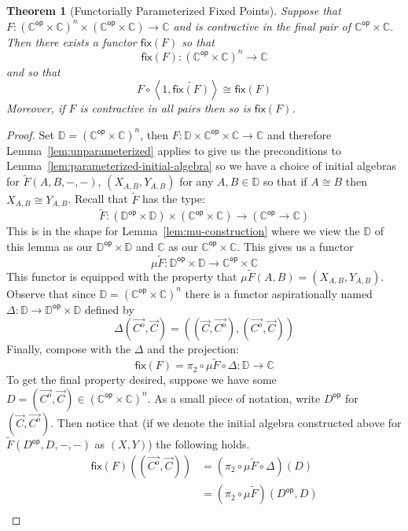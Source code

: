 \documentclass{amsart}
\newtheorem{thm}{Theorem}
\newcommand{\Ccat}{\ensuremath{\mathbb{C}}}
\newcommand{\Dcat}{\ensuremath{\mathbb{D}}}
\newcommand{\op}[1]{\ensuremath{#1^{\mathsf{op}}}}
\newcommand{\symmetrize}[1]{\ensuremath{\widetilde{#1}}}
\newcommand{\pair}[2]{\ensuremath{\left\langle #1, #2 \right\rangle}}
\newcommand{\fix}[1]{\ensuremath{\mathsf{fix}(#1)}}
\newcommand{\arr}[1]{\ensuremath{\overrightarrow{#1}}}
\begin{document}
\begin{thm}[Functorially Parameterized Fixed Points]
  Suppose that
  $F : (\op{\Ccat} \times \Ccat)^n \times (\op{\Ccat} \times \Ccat) \to \Ccat$
  and is contractive in the final pair of $\op{\Ccat} \times
  \Ccat$. Then there exists a functor $\fix{F}$ so that
  \[
    \fix{F} : (\op{\Ccat} \times \Ccat)^n \to \Ccat
  \]
  and so that
  \[
    F \circ \pair{1}{\symmetrize{\fix{F}}} \cong \fix{F}
  \]
  Moreover, if $F$ is contractive in all pairs then so is $\fix{F}$.
\end{thm}
\begin{proof}
  Set $\Dcat = (\op{\Ccat} \times \Ccat)^n$, then
  $F : \Dcat \times \op{\Ccat} \times \Ccat \to \Ccat$ and therefore
  Lemma~\ref{lem:unparameterized} applies to give us the preconditions
  to Lemma~\ref{lem:parameterized-initial-algebra} so we have a choice
  of initial algebras for $\symmetrize{F}(A, B, -, -)$,
  $(X_{A, B}, Y_{A, B})$ for any $A, B \in \Dcat$ so that if
  $A \cong B$ then $X_{A, B} \cong Y_{A, B}$. Recall that
  $\symmetrize{F}$ has the type:
  \[
    \symmetrize{F} :
    (\op{\Dcat} \times \Dcat) \times (\op{\Ccat} \times \Ccat) \to (\op{\Ccat} \to \Ccat)
  \]
  This is in the shape for Lemma~\ref{lem:mu-construction} where we
  view the $\Dcat$ of this lemma as our $\op{\Dcat} \times \Dcat$ and
  $\Ccat$ as our $\op{\Ccat} \times \Ccat$. This gives us a functor
  \[
    \mu \symmetrize{F} :
    \op{\Dcat} \times \Dcat \to \op{\Ccat} \times \Ccat
  \]
  This functor is equipped with the property that
  $\mu \symmetrize{F}(A, B) = (X_{A, B}, Y_{A, B})$. Observe that since
  $\Dcat = (\op{\Ccat} \times \Ccat)^n$ there is a functor
  aspirationally named $\Delta : \Dcat \to \op{\Dcat} \times \Dcat$
  defined by
  \[
    \Delta(\arr{C^o}, \arr{C}) = ((\arr{C}, \arr{C^o}), (\arr{C^o}, \arr{C}))
  \]
  Finally, compose with the $\Delta$ and the projection:
  \[
    \fix{F} = \pi_2 \circ \mu \symmetrize{F} \circ \Delta
    : \Dcat \to \Ccat
  \]
  To get the final property desired, suppose we have some
  $D = (\vec{C^o}, \arr{C}) \in (\op{\Ccat} \times \Ccat)^n$. As a
  small piece of notation, write $\op{D}$ for $(\vec{C}, \arr{C^o})$.
  Then notice that (if we denote the initial algebra constructed above
  for $\symmetrize{F}(\op{D}, D, -, -)$ as $(X, Y)$) the following
  holds.
  \begin{align*}
    \fix{F}((\arr{C^o}, \arr{C}))
    &= (\pi_2 \circ \mu \symmetrize{F} \circ \Delta)(D)\\
    &= (\pi_2 \circ \mu \symmetrize{F})(\op{D}, D)\\

\end{align*}
\end{proof}
\end{document}
